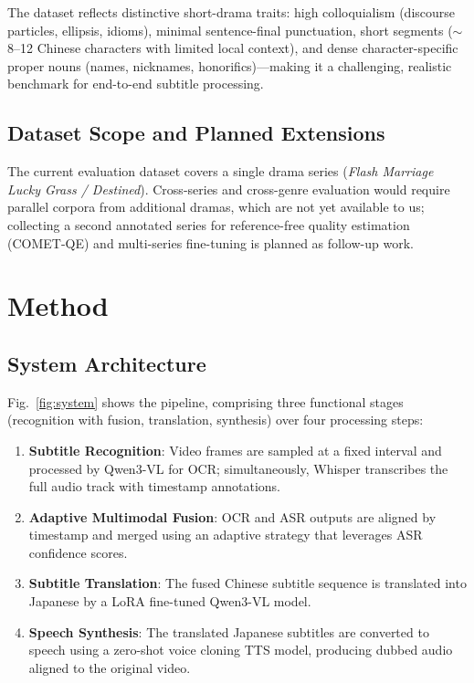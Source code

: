 \documentclass[journal]{IEEEtran}
\begin{document}
The dataset reflects distinctive short-drama traits: high colloquialism (discourse particles, ellipsis, idioms), minimal sentence-final punctuation, short segments ($\sim$8--12 Chinese characters with limited local context), and dense character-specific proper nouns (names, nicknames, honorifics)---making it a challenging, realistic benchmark for end-to-end subtitle processing.

\subsection{Dataset Scope and Planned Extensions}
The current evaluation dataset covers a single drama series (\emph{Flash Marriage Lucky Grass / Destined}).
Cross-series and cross-genre evaluation would require parallel corpora from additional dramas, which are not yet available to us; collecting a second annotated series for reference-free quality estimation (COMET-QE) and multi-series fine-tuning is planned as follow-up work.





\section{Method}
\label{sec:method}

\subsection{System Architecture}
\label{sec:arch}

Fig.~\ref{fig:system} shows the pipeline, comprising three functional stages (recognition with fusion, translation, synthesis) over four processing steps:
\begin{enumerate}
 \item \textbf{Subtitle Recognition}: Video frames are sampled at a fixed interval and processed by Qwen3-VL for OCR; simultaneously, Whisper transcribes the full audio track with timestamp annotations.
 \item \textbf{Adaptive Multimodal Fusion}: OCR and ASR outputs are aligned by timestamp and merged using an adaptive strategy that leverages ASR confidence scores.
 \item \textbf{Subtitle Translation}: The fused Chinese subtitle sequence is translated into Japanese by a LoRA fine-tuned Qwen3-VL model.
 \item \textbf{Speech Synthesis}: The translated Japanese subtitles are converted to speech using a zero-shot voice cloning TTS model, producing dubbed audio aligned to the original video.
\end{enumerate}
\end{document}
